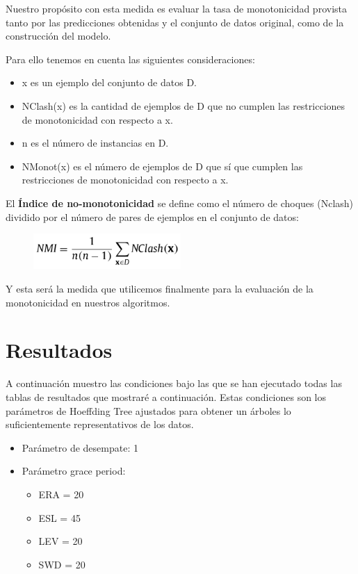 Nuestro propósito con esta medida es evaluar la tasa de monotonicidad provista tanto por las predicciones obtenidas y el conjunto de datos original, como de la construcción del modelo.

Para ello tenemos en cuenta las siguientes consideraciones:
\begin{itemize}
	\item x es un ejemplo del conjunto de datos D.
	\item NClash(x) es la cantidad de ejemplos de D que no cumplen las restricciones de monotonicidad con respecto a x.
	\item n es el número de instancias en D.
	\item NMonot(x) es el número de ejemplos de D que sí que cumplen las restricciones de monotonicidad con respecto a x.
\end{itemize}

El \textbf{Índice de no-monotonicidad} se define como el número de choques (Nclash) dividido por el número de pares de ejemplos en el conjunto de datos:

\begin{figure}[H]
	\centering
	\includegraphics[width=0.5\textwidth]{imagenes/f8} 
\end{figure}

Y esta será la medida que utilicemos finalmente para la evaluación de la monotonicidad en nuestros algoritmos.

\section{Resultados}

A continuación muestro las condiciones bajo las que se han ejecutado todas las tablas de resultados que mostraré a continuación. Estas condiciones son los parámetros de Hoeffding Tree ajustados para obtener un árboles lo suficientemente representativos de los datos.
\begin{itemize}
	\item Parámetro de desempate: 1
	\item Parámetro grace period:
	\begin{itemize}
		\item ERA = 20
		\item ESL = 45
		\item LEV = 20
		\item SWD = 20
	\end{itemize}
\end{itemize}


